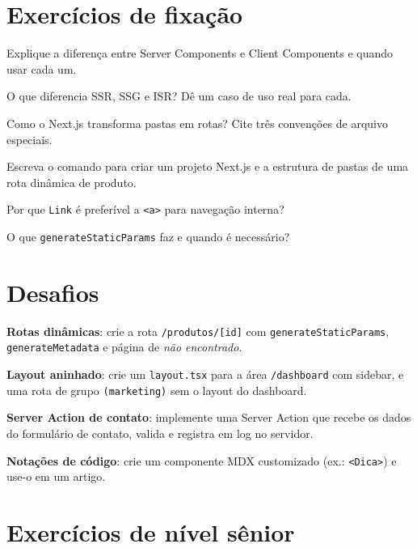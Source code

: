 \section{Exercícios de fixação}

\begin{exercicios}
  \item Explique a diferença entre Server Components e Client Components e quando usar cada um.
  \item O que diferencia SSR, SSG e ISR? Dê um caso de uso real para cada.
  \item Como o Next.js transforma pastas em rotas? Cite três convenções de arquivo especiais.
  \item Escreva o comando para criar um projeto Next.js e a estrutura de pastas de uma rota dinâmica de produto.
  \item Por que \texttt{Link} é preferível a \texttt{<a>} para navegação interna?
  \item O que \texttt{generateStaticParams} faz e quando é necessário?
\end{exercicios}

\section{Desafios}

\begin{desafios}
  \item \textbf{Rotas dinâmicas}: crie a rota \texttt{/produtos/[id]} com \texttt{generateStaticParams}, \texttt{generateMetadata} e página de \emph{não encontrado}.
  \item \textbf{Layout aninhado}: crie um \texttt{layout.tsx} para a área \texttt{/dashboard} com sidebar, e uma rota de grupo \texttt{(marketing)} sem o layout do dashboard.
  \item \textbf{Server Action de contato}: implemente uma Server Action que recebe os dados do formulário de contato, valida e registra em log no servidor.
  \item \textbf{Notações de código}: crie um componente MDX customizado (ex.: \texttt{<Dica>}) e use-o em um artigo.
\end{desafios}

\section{Exercícios de nível sênior}

